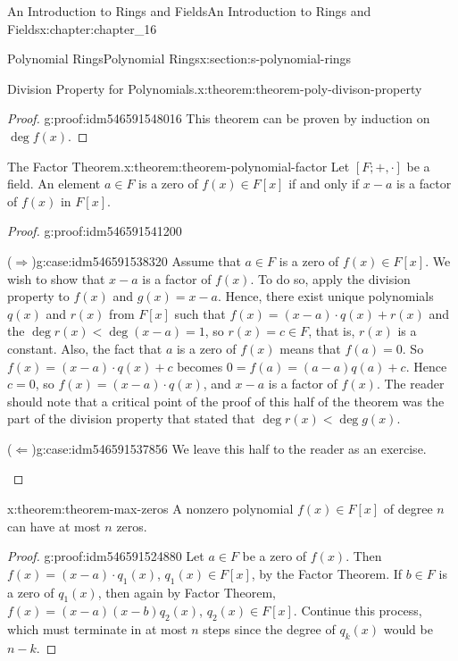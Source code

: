 \documentclass[oneside,10pt,]{book}
\newcommand{\forwardimplication}{($\Rightarrow$)}
\newcommand{\backwardimplication}{($\Leftarrow$)}
\numberwithin{equation}{section}
\begin{document}
\begin{chapterptx}{An Introduction to Rings and Fields}{}{An Introduction to Rings and Fields}{}{}{x:chapter:chapter_16}
\begin{sectionptx}{Polynomial Rings}{}{Polynomial Rings}{}{}{x:section:s-polynomial-rings}
\begin{theorem}{Division Property for Polynomials.}{}{x:theorem:theorem-poly-divison-property}
\end{theorem}
\begin{proof}{}{g:proof:idm546591548016}
This theorem can be proven by induction on \(\deg  f(x)\).%
\end{proof}
\begin{theorem}{The Factor Theorem.}{}{x:theorem:theorem-polynomial-factor}%
%
Let \([F; +, \cdot ]\) be a field. An element \(a \in  F\) is a zero of \(f(x) \in  F[x]\) if and only if \(x - a\) is a factor of \(f(x)\) in \(F[x]\).%
\end{theorem}
\begin{proof}{}{g:proof:idm546591541200}
\begin{case}{\forwardimplication}{}{g:case:idm546591538320}
Assume that \(a \in  F\) is a zero of \(f(x) \in  F[x]\). We wish to show that \(x - a\) is a factor of \(f(x)\). To do so, apply the division property to \(f(x)\) and \(g(x) = x - a\). Hence, there exist unique polynomials \(q(x)\) and \(r(x)\) from \(F[x]\) such that \(f(x) = (x - a)\cdot q(x) + r(x)\) and the \(\deg  r(x) < \deg(x - a) = 1\), so \(r (x) = c \in  F\), that is, \(r(x)\) is a constant. Also, the fact that \(a\) is a zero of \(f(x)\) means that \(f(a) = 0\).    So  \(f(x) = (x - a)\cdot  q(x) + c\)  becomes \(0 = f(a) = (a - a) q(a) + c\). Hence \(c
= 0\), so \(f(x) = (x - a) \cdot  q(x)\), and \(x - a\) is a factor of \(f(x)\). The reader should note that a critical point of the proof of this half of the theorem was the part of the division property that stated that \(\deg  r(x) < \deg  g(x)\).%
\end{case}
\begin{case}{\backwardimplication}{}{g:case:idm546591537856}
We leave this half to the reader as an exercise.%
\end{case}
\end{proof}
\begin{theorem}{}{}{x:theorem:theorem-max-zeros}%
A nonzero polynomial \(f(x) \in  F[x]\) of degree \(n\) can have at most \(n\) zeros.%
\end{theorem}
\begin{proof}{}{g:proof:idm546591524880}
Let \(a \in  F\) be a zero of \(f(x)\). Then \(f(x) = (x - a) \cdot  q_1(x)\), \(q_1(x)\in F[x]\), by the Factor Theorem. If \(b \in  F\) is a zero of \(q_1(x)\), then again by Factor Theorem, \(f(x) = (x -a)(x - b)q_2(x)\), \(q_2(x)\in F[x]\). Continue this process, which must terminate in at most \(n\) steps since the degree of \(q_k(x)\) would be \(n-k\).%
\end{proof}

\end{sectionptx}
\end{chapterptx}
\end{document}
